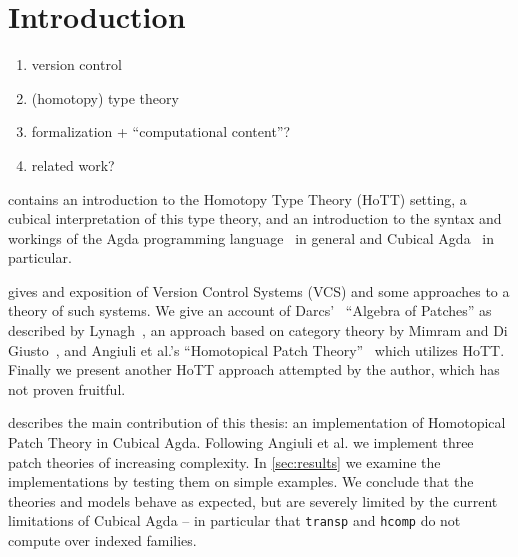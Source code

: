 \chapter{Introduction}

\begin{enumerate}
\item version control
\item (homotopy) type theory
\item formalization + ``computational content''?
\item related work?
\end{enumerate}

 contains an introduction to the Homotopy Type Theory (HoTT)
setting, a cubical interpretation of this type theory, and an introduction to
the syntax and workings of the Agda programming language~\cite{Agda} in general and Cubical
Agda~\cite{vezzosi2021cubical} in particular.

 gives and exposition of Version Control Systems (VCS) and some
approaches to a theory of such systems. We give an account of
Darcs'~\cite{Darcs} ``Algebra of Patches'' as described by
Lynagh~\cite{Lynagh2006}, an approach based on category theory by Mimram and Di
Giusto~\cite{Categorical2013}, and Angiuli et al.'s ``Homotopical Patch
Theory''~\cite{Angiuli2016} which utilizes HoTT. Finally we present another
HoTT approach attempted by the author, which has not proven fruitful.

 describes the main contribution of this thesis: an
implementation of Homotopical Patch Theory in Cubical Agda. Following Angiuli et
al. we implement three patch theories of increasing complexity. In
\autoref{sec:results} we examine the implementations by testing them on simple
examples. We conclude that the theories and models behave as expected, but are
severely limited by the current limitations of Cubical Agda -- in particular
that \texttt{transp} and \texttt{hcomp} do not compute over indexed families.